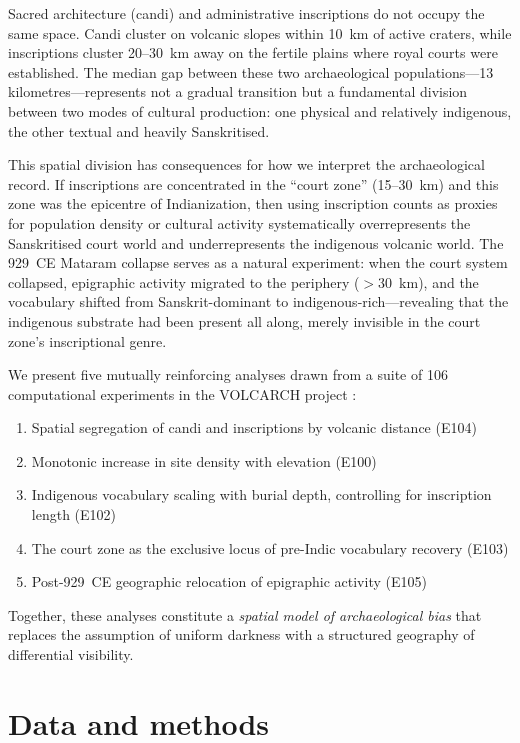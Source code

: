 \documentclass[12pt]{article}
\begin{document}
Sacred architecture (candi) and administrative inscriptions do not occupy the same space.
Candi cluster on volcanic slopes within 10~km of active craters, while inscriptions cluster 20--30~km away on the fertile plains where royal courts were established.
The median gap between these two archaeological populations---13 kilometres---represents not a gradual transition but a fundamental division between two modes of cultural production: one physical and relatively indigenous, the other textual and heavily Sanskritised.

This spatial division has consequences for how we interpret the archaeological record.
If inscriptions are concentrated in the ``court zone'' (15--30~km) and this zone was the epicentre of Indianization, then using inscription counts as proxies for population density or cultural activity systematically overrepresents the Sanskritised court world and underrepresents the indigenous volcanic world.
The 929~CE Mataram collapse serves as a natural experiment: when the court system collapsed, epigraphic activity migrated to the periphery ($>$30~km), and the vocabulary shifted from Sanskrit-dominant to indigenous-rich---revealing that the indigenous substrate had been present all along, merely invisible in the court zone's inscriptional genre.

We present five mutually reinforcing analyses drawn from a suite of 106 computational experiments in the VOLCARCH project \citep{Amien2026a}:
\begin{enumerate}
    \item Spatial segregation of candi and inscriptions by volcanic distance (E104)
    \item Monotonic increase in site density with elevation (E100)
    \item Indigenous vocabulary scaling with burial depth, controlling for inscription length (E102)
    \item The court zone as the exclusive locus of pre-Indic vocabulary recovery (E103)
    \item Post-929~CE geographic relocation of epigraphic activity (E105)
\end{enumerate}

Together, these analyses constitute a \emph{spatial model of archaeological bias} that replaces the assumption of uniform darkness with a structured geography of differential visibility.


\section{Data and methods}
\end{document}
